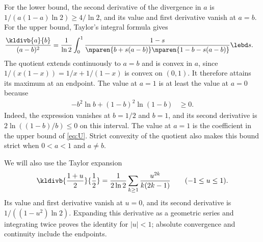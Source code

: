 For the lower bound, the second derivative of the divergence in
$a$ is $1/(a(1-a)\ln2)\ge4/\ln2$, and its value and first
derivative vanish at $a=b$.
For the upper bound, Taylor's integral formula gives
\begin{align*}
 \frac{\kldivb{a}{b}}{(a-b)^2}
 &=\frac1{\ln2}\int_0^1
   \frac{1-s}{\nparen{b+s(a-b)}\nparen{1-b-s(a-b)}}
   \lebd s.
\end{align*}
The quotient extends continuously to $a=b$ and is convex in $a$,
since $1/(x(1-x))=1/x+1/(1-x)$ is convex on $(0,1)$.
It therefore attains its maximum at an endpoint.
The value at $a=1$ is at least the value at $a=0$ because
\begin{align*}
 -b^2\ln b+(1-b)^2\ln(1-b)&\ge0.
\end{align*}
Indeed, the expression vanishes at $b=1/2$ and $b=1$, and its
second derivative is $2\ln((1-b)/b)\le0$ on this interval.
The value at $a=1$ is the coefficient in the upper bound of
\eqref{eq:U}. Strict convexity of the quotient also makes this
bound strict when $0<a<1$ and $a\ne b$.

We will also use the Taylor expansion
\begin{equation}
\label{eq:binary-divergence-series}
 \kldivb{\frac{1+u}{2}}{\frac 12}
 =\frac1{2\ln2}\sum_{k\ge1}\frac{u^{2k}}{k(2k-1)}
 \qquad(-1\le u\le1).
\end{equation}
Its value and first derivative vanish at $u=0$, and its second
derivative is $1/((1-u^2)\ln2)$.
Expanding this derivative as a geometric series and integrating
twice proves the identity for $|u|<1$; absolute convergence and
continuity include the endpoints.
\fi
